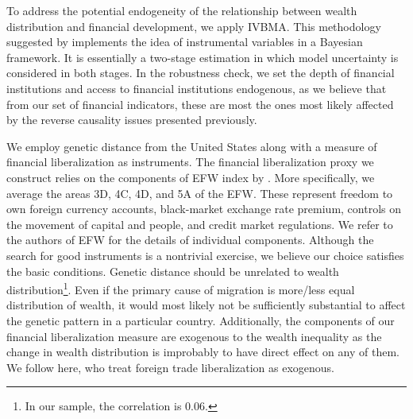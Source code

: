 \begin{refsection}
To address the potential endogeneity of the relationship between wealth distribution and financial development, we apply \ac{IVBMA}. This methodology suggested by \textcite{KarlLenkoski2012} implements the idea of instrumental variables in a Bayesian framework. It is essentially a two-stage estimation in which model uncertainty is considered in both stages. In the robustness check, we set the depth of financial institutions and access to financial institutions endogenous, as we believe that from our set of financial indicators, these are most the ones most likely affected by the reverse causality issues presented previously.

We employ genetic distance from the United States \parencite{spolaore2009diffusion} along with a measure of financial liberalization as instruments. The financial liberalization proxy we construct relies on the components of \ac{EFW} index by \parencite{gwartney2017}. More specifically, we average the areas 3D, 4C, 4D, and 5A of the \ac{EFW}. These represent freedom to own foreign currency accounts, black-market exchange rate premium, controls on the movement of capital and people, and credit market regulations. We refer to the authors of \ac{EFW} for the details of individual components. Although the search for good instruments is a nontrivial exercise, we believe our choice satisfies the basic conditions. Genetic distance should be unrelated to wealth distribution\footnote{In our sample, the correlation is 0.06.}. Even if the primary cause of migration is more/less equal distribution of wealth, it would most likely not be sufficiently substantial to affect the genetic pattern in a particular country. Additionally, the components of our financial liberalization measure are exogenous to the wealth inequality as the change in wealth distribution is improbably to have direct effect on any of them. We follow \textcite{estev} here, who treat foreign trade liberalization as exogenous.


\end{refsection}
